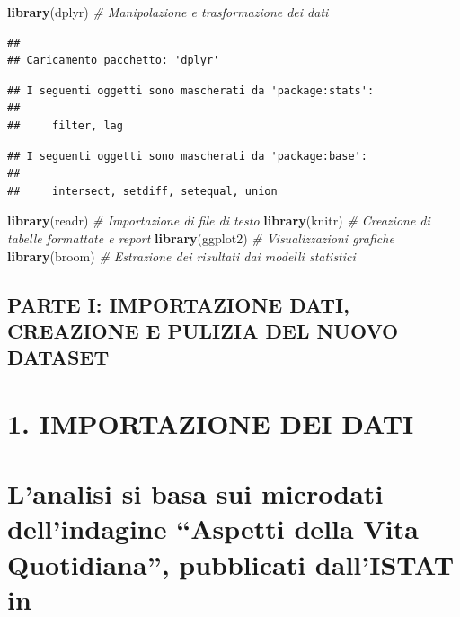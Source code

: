 \documentclass[
]{article}
\newenvironment{Shaded}{\begin{snugshade}}{\end{snugshade}}
\newcommand{\CommentTok}[1]{\textcolor[rgb]{0.56,0.35,0.01}{\textit{#1}}}
\newcommand{\FunctionTok}[1]{\textcolor[rgb]{0.13,0.29,0.53}{\textbf{#1}}}
\newcommand{\NormalTok}[1]{#1}
\begin{document}
\begin{Shaded}
\begin{Highlighting}[]
\FunctionTok{library}\NormalTok{(dplyr)   }\CommentTok{\# Manipolazione e trasformazione dei dati}
\end{Highlighting}
\end{Shaded}

\begin{verbatim}
## 
## Caricamento pacchetto: 'dplyr'
\end{verbatim}

\begin{verbatim}
## I seguenti oggetti sono mascherati da 'package:stats':
## 
##     filter, lag
\end{verbatim}

\begin{verbatim}
## I seguenti oggetti sono mascherati da 'package:base':
## 
##     intersect, setdiff, setequal, union
\end{verbatim}

\begin{Shaded}
\begin{Highlighting}[]
\FunctionTok{library}\NormalTok{(readr)   }\CommentTok{\# Importazione di file di testo}
\FunctionTok{library}\NormalTok{(knitr)   }\CommentTok{\# Creazione di tabelle formattate e report}
\FunctionTok{library}\NormalTok{(ggplot2) }\CommentTok{\# Visualizzazioni grafiche}
\FunctionTok{library}\NormalTok{(broom)   }\CommentTok{\# Estrazione dei risultati dai modelli statistici}
\end{Highlighting}
\end{Shaded}

\subsection{PARTE I: IMPORTAZIONE DATI, CREAZIONE E PULIZIA DEL NUOVO
DATASET}\label{parte-i-importazione-dati-creazione-e-pulizia-del-nuovo-dataset}

\section{1. IMPORTAZIONE DEI DATI}\label{importazione-dei-dati}

\section{L'analisi si basa sui microdati dell'indagine ``Aspetti della
Vita Quotidiana'', pubblicati dall'ISTAT
in}\label{lanalisi-si-basa-sui-microdati-dellindagine-aspetti-della-vita-quotidiana-pubblicati-dallistat-in}
\end{document}

